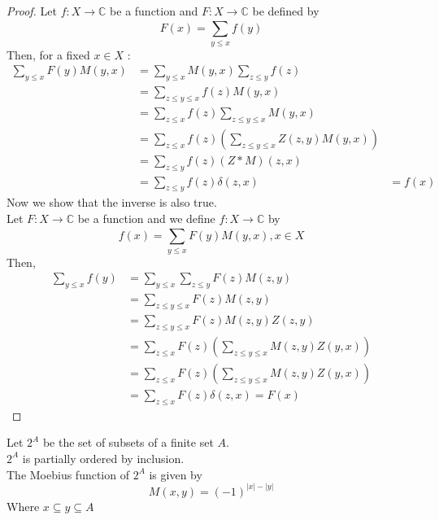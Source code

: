 \documentclass[../main.tex]{subfiles}
\begin{document}
\begin{proof}
	Let $f:X \to \mathbb{C}$ be a function and $F:X \to \mathbb{C}$ be defined by
	\[ 
		F( x) = \sum_{y \leq x }^{ } f( y) 
	\]
Then, for a fixed $x \in X$ :
\begin{align*}
	\sum_{y \leq x}^{ } F(y) M( y,x)  &= \sum_{y \leq x}^{ } M( y,x) \sum_{z \leq y}^{ } f( z) \\
					  &= \sum_{z \leq  y \leq x}^{ } f( z) M( y,x) \\
					  &= \sum_{z \leq x}^{ } f( z)  \sum_{z \leq  y \leq x}^{ } M( y,x) \\
					  &= \sum_{z \leq  x}^{ } f( z)  \left( \sum_{z \leq  y \leq x}^{ } Z( z,y) M( y,x) \right) \\
					  &= \sum_{z \leq  y}^{ } f( z)  ( Z \ast M) ( z,x) \\
					  &= \sum_{z \leq  y}^{ } f( z)  \delta( z,x) 
					  &= f( x) 	
\end{align*}
Now we show that the inverse is also true.\\
Let $F: X \to \mathbb{C}$ be a function and we define $f: X \to \mathbb{C}$ by
\[ 
	f( x) = \sum_{y \leq x}^{ } F( y) M( y,x) , x \in X
\]
Then,
\begin{align*}
	\sum_{y \leq x}^{ } f( y) &= \sum_{y \leq x}^{ } \sum_{z \leq  y}^{ } F( z) M( z,y) \\
				  &= \sum_{z \leq  y \leq x}^{ } F( z)  M( z,y) \\
				  &= \sum_{z \leq  y \leq x}^{ } F( z) M( z,y) Z( z,y) \\
				  &= \sum_{z \leq  x}^{ } F( z)  \left( \sum_{z \leq y \leq x}^{ } M( z,y) Z( y,x)  \right) \\
				  &= \sum_{z \leq  x}^{ } F( z)  \left( \sum_{z \leq  y \leq x}^{ } M( z,y) Z( y,x)  \right) \\
				  &= \sum_{z \leq  x}^{ } F( z)  \delta( z,x) = F( x) 
\end{align*}
\end{proof}
\begin{lemma}
	Let $2^{A}$ be the set of subsets of a finite set $A$.\\
	$2^{A}$ is partially ordered by inclusion.\\
	The Moebius function of $2^{A}$ is given by
	\[ 
		M( x,y) = ( -1) ^{|x| - |y|}
	\]
	Where $x \subseteq y \subseteq A$
\end{lemma}
\end{document}
